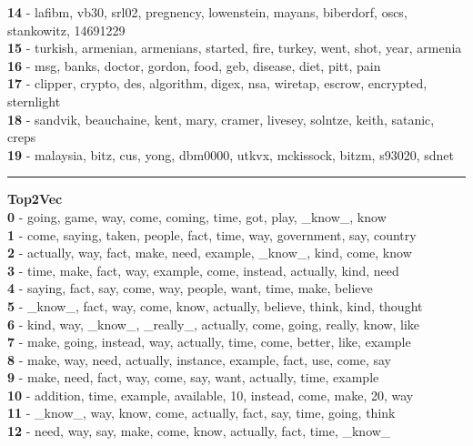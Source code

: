 \textbf{14} - lafibm, vb30, srl02, pregnency, lowenstein, mayans, biberdorf, oscs, stankowitz, 14691229\\
\textbf{15} - turkish, armenian, armenians, started, fire, turkey, went, shot, year, armenia\\
\textbf{16} - msg, banks, doctor, gordon, food, geb, disease, diet, pitt, pain\\
\textbf{17} - clipper, crypto, des, algorithm, digex, nsa, wiretap, escrow, encrypted, sternlight\\
\textbf{18} - sandvik, beauchaine, kent, mary, cramer, livesey, solntze, keith, satanic, creps\\
\textbf{19} - malaysia, bitz, cus, yong, dbm0000, utkvx, mckissock, bitzm, s93020, sdnet\\
\hrule\vspace{2mm}
\noindent
\textbf{Top2Vec}\vspace{2mm}\\
\vspace{2mm}
\noindent
\textbf{0} - going, game, way, come, coming, time, got, play, \_know\_, know\\
\textbf{1} - come, saying, taken, people, fact, time, way, government, say, country\\
\textbf{2} - actually, way, fact, make, need, example, \_know\_, kind, come, know\\
\textbf{3} - time, make, fact, way, example, come, instead, actually, kind, need\\
\textbf{4} - saying, fact, say, come, way, people, want, time, make, believe\\
\textbf{5} - \_know\_, fact, way, come, know, actually, believe, think, kind, thought\\
\textbf{6} - kind, way, \_know\_, \_really\_, actually, come, going, really, know, like\\
\textbf{7} - make, going, instead, way, actually, time, come, better, like, example\\
\textbf{8} - make, way, need, actually, instance, example, fact, use, come, say\\
\textbf{9} - make, need, fact, way, come, say, want, actually, time, example\\
\textbf{10} - addition, time, example, available, 10, instead, come, make, 20, way\\
\textbf{11} - \_know\_, way, know, come, actually, fact, say, time, going, think\\
\textbf{12} - need, way, say, make, come, know, actually, fact, time, \_know\_\\
